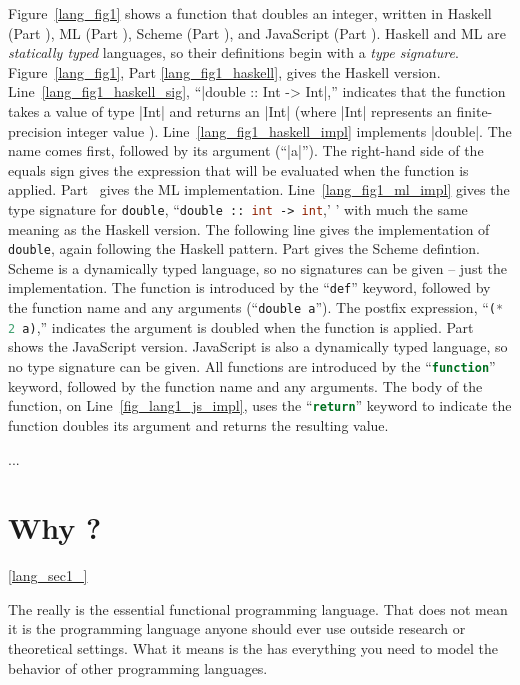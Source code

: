 \documentclass[12pt]{report}
\begin{document}
Figure~\ref{lang_fig1} shows a function that doubles an integer,
written in Haskell (Part ), ML (Part
), Scheme (Part ), and
JavaScript (Part ). Haskell and ML are
\emph{statically typed} languages, so their definitions begin with a
\emph{type signature}. Figure~\ref{lang_fig1}, Part
\ref{lang_fig1_haskell}, gives the Haskell
version. Line~\ref{lang_fig1_haskell_sig}, ``|double :: Int -> Int|,''
indicates that the function takes a value of type |Int| and returns an
|Int| (where |Int| represents an finite-precision integer value
\citep{HaskellReport}). Line~\ref{lang_fig1_haskell_impl} implements
|double|. The name comes first, followed by its argument
(``|a|''). The right-hand side of the equals sign gives the expression
that will be evaluated when the function is
applied. Part~ gives the ML
implementation. Line~\ref{lang_fig1_ml_impl} gives the type signature
for \lstinline[language=ml]=double=, ``\lstinline[language=ml]=double
:: int -> int=,' ' with much the same meaning as the Haskell
version. The following line gives the implementation of
\lstinline[language=ml]=double=, again following the Haskell
pattern. Part  gives the Scheme
defintion. Scheme is a dynamically typed language, so no signatures
can be given -- just the implementation. The function is introduced by
the ``\lstinline[language=scheme]=def='' keyword, followed by the
function name and any arguments (``\lstinline[language=scheme]=double
a='').  The postfix expression, ``\lstinline[language=scheme]=(* 2
a)=,'' indicates the argument is doubled when the function is
applied. Part  shows the JavaScript
version. JavaScript is also a dynamically typed language, so no type
signature can be given. All functions are introduced by the
``\lstinline[language=javascript]=function='' keyword, followed by the
function name and any arguments. The body of the function, on
Line~\ref{fig_lang1_js_impl}, uses the
``\lstinline[language=javascript]=return='' keyword to indicate the
function doubles its argument and returns the resulting value.

...

\section{Why \LamA?}
\ref{lang_sec1_}

The \lamA really is the essential functional programming language.  
That does not mean it is the programming language anyone
should ever use outside research or theoretical settings. What it
means is the \lamA has everything you need to model the behavior
of other programming languages. 
\end{document}
